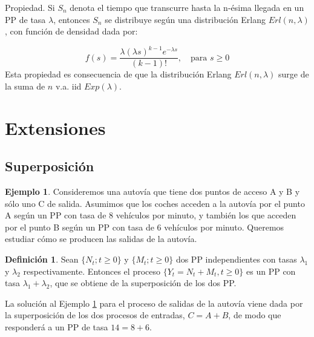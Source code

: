 \documentclass[
]{book}
\newenvironment{yellowbox}{
  \definecolor{shadecolor}{rgb}{210, 180, 140}  
  \color{black}
  \begin{shaded}}
 {\end{shaded}}
\newenvironment{bluebox}{
  \definecolor{shadecolor}{rgb}{176, 196, 222}  
  \color{black}
  \begin{shaded}}
 {\end{shaded}}
\theoremstyle{definition}
\newtheorem{definition}{Definición}[chapter]
\theoremstyle{definition}
\newtheorem{example}{Ejemplo}[chapter]
\theoremstyle{definition}
\theoremstyle{definition}
\theoremstyle{remark}
\begin{document}
\begin{bluebox}
Propiedad. Si \(S_n\) denota el tiempo que transcurre hasta la n-ésima llegada en un PP de tasa \(\lambda\), entonces \(S_n\) se distribuye según una distribución Erlang \(Erl(n,\lambda)\), con función de densidad dada por:

\[f(s) = \frac{\lambda(\lambda s)^{k-1}e^{-\lambda s}}{(k-1)!}, \quad \text{para } s \geq 0\] Esta propiedad es consecuencia de que la distribución Erlang \(Erl(n,\lambda)\) surge de la suma de \(n\) v.a. iid \(Exp(\lambda)\).

\end{bluebox}

\hypertarget{extensiones_pp}{%
\section{Extensiones}\label{extensiones_pp}}

\hypertarget{superposicion_pp}{%
\subsection{Superposición}\label{superposicion_pp}}

\begin{example}
\protect\hypertarget{exm:pp002}{}\label{exm:pp002}Consideremos una autovía que tiene dos puntos de acceso A y B y sólo uno C de salida. Asumimos que los coches acceden a la autovía por el punto A según un PP con tasa de 8 vehículos por minuto, y también los que acceden por el punto B según un PP con tasa de 6 vehículos por minuto. Queremos estudiar cómo se producen las salidas de la autovía.
\end{example}

\begin{yellowbox}

\begin{definition}
Sean \(\{N_t; t \geq 0\}\) y \(\{M_t; t \geq 0\}\) dos PP independientes con tasas \(\lambda_1\) y \(\lambda_2\) respectivamente. Entonces el proceso \(\{Y_t = N_t + M_t, t \geq 0\}\) es un PP con tasa \(\lambda_1 + \lambda_2\), que se obtiene de la superposición de los dos PP.
\end{definition}

\end{yellowbox}

La solución al Ejemplo \ref{exm:pp002} para el proceso de salidas de la autovía viene dada por la superposición de los dos procesos de entradas, \(C=A+B\), de modo que responderá a un PP de tasa \(14=8+6\).
\end{document}
